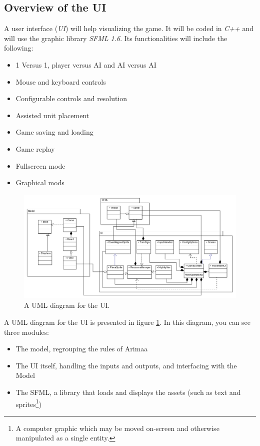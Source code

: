 \subsection{Overview of the UI}

A user interface (\emph{UI}) will help visualizing the game.
It will be coded in \emph{C++} and will use the graphic library \emph{SFML 1.6}.
Its functionalities will include the following:
\begin{itemize}
	\item 1 Versus 1, player versus AI and AI versus AI
	\item Mouse and keyboard controls
	\item Configurable controls and resolution
	\item Assisted unit placement
	\item Game saving and loading
	\item Game replay
	\item Fullscreen mode
	\item Graphical mods
\end{itemize}

\begin{figure}[!h]
\centering
\includegraphics[width=\textwidth]{Gui/Img/Application_UML.png}
\caption{A UML diagram for the UI.}
\label{fig:UML_UI}
\end{figure}

A UML diagram for the UI is presented in figure \ref{fig:UML_UI}.
In this diagram, you can see three modules:
\begin{itemize}
	\item The model, regrouping the rules of Arimaa
	\item The UI itself, handling the inputs and outputs, and interfacing with the Model
	\item The SFML, a library that loads and displays the assets (such as text and sprites\footnote{A computer graphic which may be moved on-screen and otherwise manipulated as a single entity.})
\end{itemize}

